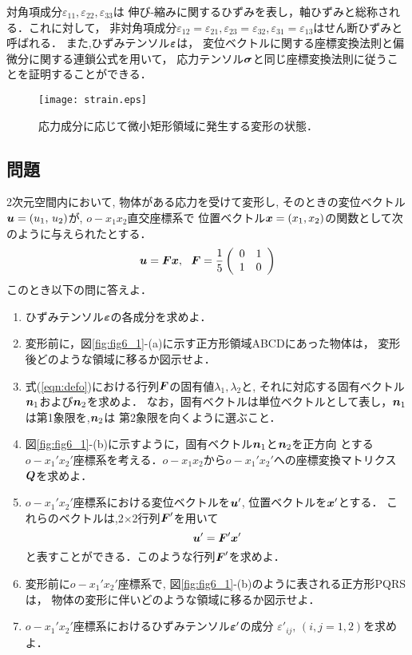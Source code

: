 \documentclass[10pt,a4j]{jarticle}
\begin{document}
対角項成分$\varepsilon_{11},\varepsilon_{22},\varepsilon_{33}$は
伸び-縮みに関するひずみを表し，軸ひずみと総称される．これに対して，
非対角項成分$\varepsilon_{12}=\varepsilon_{21},\varepsilon_{23}=\varepsilon_{32},
\varepsilon_{31}=\varepsilon_{13}$はせん断ひずみと呼ばれる．
また,ひずみテンソル$\mbox{\boldmath $\varepsilon$}$は，
変位ベクトルに関する座標変換法則と偏微分に関する連鎖公式を用いて，
応力テンソル$\mbox{\boldmath $\sigma$}$と同じ座標変換法則に従うことを証明することができる．
\begin{figure}[h]
	\begin{center}
	\texttt{[image: strain.eps]} 
	\end{center}
	\caption{応力成分に応じて微小矩形領域に発生する変形の状態．} 
	\label{fig:fig3_1}
\end{figure}
\subsection{問題}
2次元空間内において, 物体がある応力を受けて変形し, 
そのときの変位ベクトル$\mbox{\boldmath $u$}=(u_1, \, u_2)$が, $o-x_1x_2$直交座標系で
位置ベクトル$\mbox{\boldmath $x$}=(x_1, x_2)$の関数として次のように与えられたとする．
\begin{equation}
	\fat{u}
	=
	\fat{F}\fat{x}
	, \ \ 
	\fat{F}=
	\frac{1}{5}
	\left( 
		\begin{array}{cc}
		 0 & 1\\
		 1 & 0 
		\end{array}
	\right)
	\label{eqn:defo}
\end{equation}
このとき以下の問に答えよ．
\begin{enumerate}
\item
	ひずみテンソル$\mbox{\boldmath $\varepsilon$}$の各成分を求めよ．
\item
	変形前に，図\ref{fig:fig6_1}-(a)に示す正方形領域ABCDにあった物体は，
	変形後どのような領域に移るか図示せよ．
\item
	式(\ref{eqn:defo})における行列$\mbox{\boldmath $F$}$の固有値$\lambda_1, \lambda_2$と, 
	それに対応する固有ベクトル$\mbox{\boldmath $n$}_1$および$\mbox{\boldmath $n$}_2$を求めよ．	
	なお，固有ベクトルは単位ベクトルとして表し，$\mbox{\boldmath $n$}_1$は第1象限を,$\mbox{\boldmath $n$}_2$は
	第2象限を向くように選ぶこと．
\item
	図\ref{fig:fig6_1}-(b)に示すように，固有ベクトル$\mbox{\boldmath $n$}_1$と$\mbox{\boldmath $n$}_2$を正方向
	とする$o-x_1'x_2'$座標系を考える．$o-x_1x_2$から$o-x_1'x_2'$への座標変換マトリクス
	$\mbox{\boldmath $Q$}$を求めよ．
\item
	$o-x_1'x_2'$座標系における変位ベクトルを$\mbox{\boldmath $u$}'$, 位置ベクトルを$\mbox{\boldmath $x$}'$とする．
	これらのベクトルは,2$\times$2行列$\mbox{\boldmath $F$}'$を用いて
	\[
		\mbox{\boldmath $u$}'=\mbox{\boldmath $F$}'\mbox{\boldmath $x$}'
	\]
	と表すことができる．このような行列$\mbox{\boldmath $F$}'$を求めよ．
\item
	変形前に$o-x_1'x_2'$座標系で, 図\ref{fig:fig6_1}-(b)のように表される正方形PQRSは，
	物体の変形に伴いどのような領域に移るか図示せよ．
\item
	$o-x_1'x_2'$座標系におけるひずみテンソル$\mbox{\boldmath $\varepsilon$}'$の成分
	$\varepsilon'_{ij}, \, (i,j=1,2)$を求めよ．
\end{enumerate}
\end{document}
